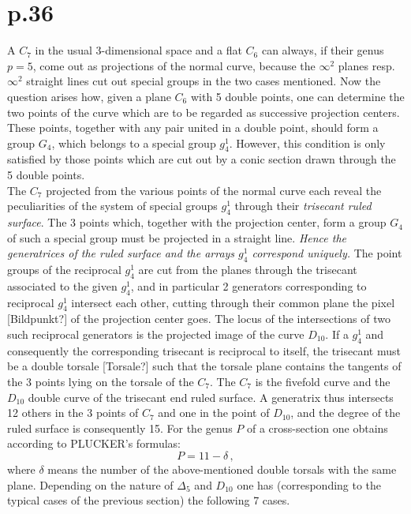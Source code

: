 \documentclass[leqno]{article}
\begin{document}
\section{p.36}
A $C_7$ in the usual 3-dimensional space and a flat $C_6$ can always, if their genus $p=5$, come out as projections of the normal curve, because the $\infty^2$ planes resp. $\infty^2$ straight lines cut out special groups in the two cases mentioned. Now the question arises how, given a plane $C_6$ with 5 double points, one can determine the two points of the curve which are to be regarded as successive projection centers. These points, together with any pair united in a double point, should form a group $G_4$, which belongs to a special group $g_4^1$. However, this condition is only satisfied by those points which are cut out by a conic section drawn through the 5 double points. \\
The $C_7$ projected from the various points of the normal curve each reveal the peculiarities of the system of special groups $g_4^1$ through their \textit{trisecant ruled surface}. The 3 points which, together with the projection center, form a group $G_4$ of such a special group must be projected in a straight line. \textit{Hence the generatrices of the ruled surface and the arrays $g_4^1$ correspond uniquely.} The point groups of the reciprocal $g_4^1$ are cut from the planes through the trisecant associated to the given $g_4^1$, and in particular 2 generators corresponding to reciprocal $g_4^1$ intersect each other, cutting through their common plane the pixel [Bildpunkt?] of the projection center goes. The locus of the intersections of two such reciprocal generators is the projected image of the curve $D_{10}$. If a $g_4^1$ and consequently the corresponding trisecant is reciprocal to itself, the trisecant must be a double torsale [Torsale?] such that the torsale plane contains the tangents of the 3 points lying on the torsale of the $C_7$.
The $C_7$ is the fivefold curve and the $D_{10}$ double curve of the trisecant end ruled surface. A generatrix thus intersects 12 others in the 3 points of $C_7$ and one in the point of $D_{10}$, and the degree of the ruled surface is consequently 15. For the genus $P$ of a cross-section one obtains according to PLUCKER's formulas: 
\[
P=11-\delta \, , 
\]
where $\delta$ means the number of the above-mentioned double torsals with the same plane. Depending on the nature of $\Delta_5$ and $D_{10}$ one has (corresponding to the typical cases of the previous section) the following 7 cases.
\end{document}
